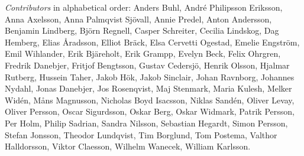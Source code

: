 \emph{Contributors} in alphabetical order:
Anders Buhl,
André Philipsson Eriksson,
Anna Axelsson,
Anna Palmqvist Sjövall,
Annie Predel,
Anton Andersson,
Benjamin Lindberg,
Björn Regnell,
Casper Schreiter,
Cecilia Lindskog,
Dag Hemberg,
Elias Åradsson,
Elliot Bräck,
Elsa Cervetti Ogestad,
Emelie Engström,
Emil Wihlander,
Erik Bjäreholt,
Erik Grampp,
Evelyn Beck,
Felix Ohrgren,
Fredrik Danebjer,
Fritjof Bengtsson,
Gustav Cedersjö,
Henrik Olsson,
Hjalmar Rutberg,
Hussein Taher,
Jakob Hök,
Jakob Sinclair,
Johan Ravnborg,
Johannes Nydahl,
Jonas Danebjer,
Jos Rosenqvist,
Maj Stenmark,
Maria Kulesh,
Melker Widén,
Måns Magnusson,
Nicholas Boyd Isacsson,
Niklas Sandén,
Oliver Levay,
Oliver Persson,
Oscar Sigurdsson,
Oskar Berg,
Oskar Widmark,
Patrik Persson,
Per Holm,
Philip Sadrian,
Sandra Nilsson,
Sebastian Hegardt,
Simon Persson,
Stefan Jonsson,
Theodor Lundqvist,
Tim Borglund,
Tom Postema,
Valthor Halldorsson,
Viktor Claesson,
Wilhelm Wanecek,
William Karlsson.

